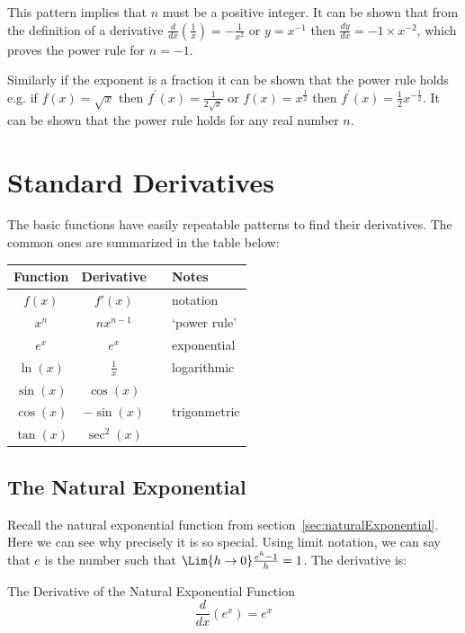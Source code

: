 This pattern implies that $n$ must be a positive integer. It can be shown that from the definition of a derivative $\frac{d}{d x} \genfrac{(}{)}{}{}{1}{x} = -\frac{1}{x^{2}}$ or $y =x^{ -1}$ then $\frac{d y}{d x} = -1 \times x^{ -2}$, which proves the power rule for $n = -1$. 

Similarly if the exponent is a fraction it can be shown that the power rule holds e.g. if $f (x) =\sqrt{x}$ then $f^{ \prime } (x) =\frac{1}{2 \sqrt{x}}$ or $f (x) =x^{\frac{1}{2}}$ then $f^{ \prime } (x) =\frac{1}{2} x^{ -\frac{1}{2}}$. It can be shown that the power rule holds for any real number $n$. 

\section{Standard Derivatives}
The basic functions have easily repeatable patterns to find their derivatives. The common ones are summarized in the table below:
\begin{center}
\begin{tabular}{ccll}	
	\toprule
	Function& Derivative&&Notes\\\midrule
	$f(x)$ & $f'(x)$  &&notation\\ \midrule
	$x^n$ & $nx^{n-1}$ &&`power rule'\\ \midrule
	$e^x$ & $e^x$  && exponential\\ \midrule
	$\ln(x)$ & $\frac{1}{x}$ &&logarithmic\\ \midrule
	$\sin(x)$ & $\cos(x)$  && \\ \cmidrule{1-2}
	$\cos(x)$ & $-\sin(x)$ && trigonmetric\\ \cmidrule{1-2}
	$\tan(x)$ & $\sec^2(x)$ && \\ \bottomrule
\end{tabular}
\end{center}


\subsection*{The Natural Exponential}
Recall the natural exponential function from section~\ref{sec:naturalExponential}. Here we can see why precisely it is so special. Using limit notation, we can say that $e$ is the number such that $\Lim{h\to 0}\frac{e^{h} -1}{h} =1$. The derivative is:

\begin{tcolorbox}
The Derivative of the Natural Exponential Function
$$\frac{d}{d x} \left (e^{x}\right ) =e^{x}$$
\end{tcolorbox}

